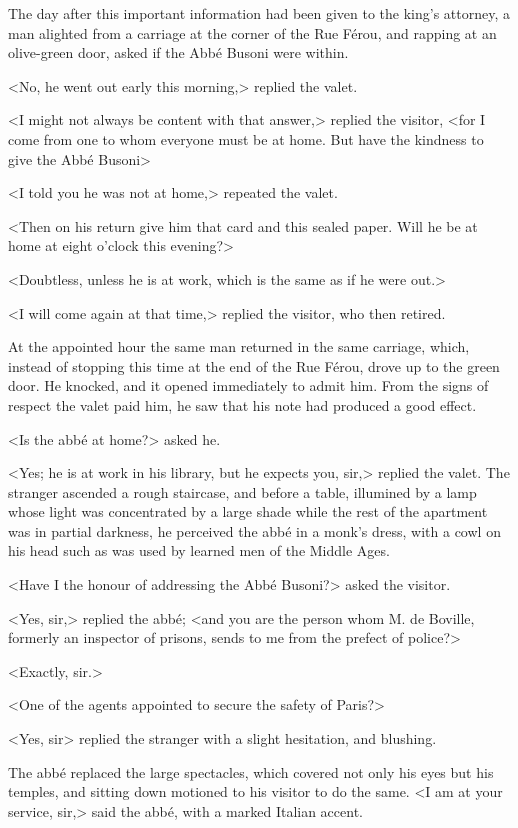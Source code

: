  The day after this important information had been given to the king's attorney, a man alighted from a carriage at the corner of the Rue Férou, and rapping at an olive-green door, asked if the Abbé Busoni were within. 

 <No, he went out early this morning,> replied the valet. 

 <I might not always be content with that answer,> replied the visitor, <for I come from one to whom everyone must be at home. But have the kindness to give the Abbé Busoni\longdash> 

 <I told you he was not at home,> repeated the valet. 

 <Then on his return give him that card and this sealed paper. Will he be at home at eight o'clock this evening?> 

 <Doubtless, unless he is at work, which is the same as if he were out.> 

 <I will come again at that time,> replied the visitor, who then retired. 

 At the appointed hour the same man returned in the same carriage, which, instead of stopping this time at the end of the Rue Férou, drove up to the green door. He knocked, and it opened immediately to admit him. From the signs of respect the valet paid him, he saw that his note had produced a good effect. 

 <Is the abbé at home?> asked he. 

 <Yes; he is at work in his library, but he expects you, sir,> replied the valet. The stranger ascended a rough staircase, and before a table, illumined by a lamp whose light was concentrated by a large shade while the rest of the apartment was in partial darkness, he perceived the abbé in a monk's dress, with a cowl on his head such as was used by learned men of the Middle Ages. 

 <Have I the honour of addressing the Abbé Busoni?> asked the visitor. 

 <Yes, sir,> replied the abbé; <and you are the person whom M. de Boville, formerly an inspector of prisons, sends to me from the prefect of police?> 

 <Exactly, sir.> 

 <One of the agents appointed to secure the safety of Paris?> 

 <Yes, sir> replied the stranger with a slight hesitation, and blushing. 

 The abbé replaced the large spectacles, which covered not only his eyes but his temples, and sitting down motioned to his visitor to do the same. <I am at your service, sir,> said the abbé, with a marked Italian accent. 

